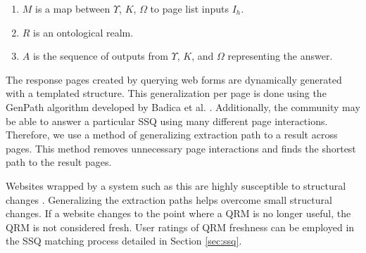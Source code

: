 \begin{enumerate}
\item $M$ is a map between $\Upsilon$, $K$, $\Omega$ to page list inputs $I_h$.

\item $R$ is an ontological realm. 

\item $A$ is the sequence of outputs from $\Upsilon$, $K$, and
  $\Omega$ representing the answer.

\end{enumerate}


The response pages created by querying web forms are dynamically
generated with a templated structure. This generalization per page is
done using the GenPath algorithm developed by Badica et
al. \cite{Badica06}. Additionally, the community may be able to answer
a particular SSQ using many different page interactions. Therefore, we
use a method of generalizing extraction path to a result across
pages. This method removes unnecessary page interactions and finds the
shortest path to the result pages.

Websites wrapped by a system such as this are highly susceptible to
structural changes \cite{TanZMG07}. Generalizing the extraction paths
helps overcome small structural changes. If a website changes to the
point where a QRM is no longer useful, the QRM is not considered
fresh. User ratings of QRM freshness can be employed in the SSQ matching
process detailed in Section \ref{sec:ssq}.

